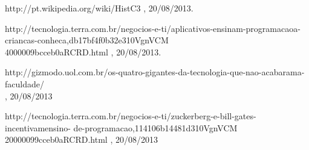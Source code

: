 \documentclass{sciposter}
\begin{document}
\begin{multicols}{3}


\begin{thebibliography}{1}

\newblock http://pt.wikipedia.org/wiki/HistC3%
, 20/08/2013.

\newblock http://tecnologia.terra.com.br/negocios-e-ti/aplicativos-ensinam-programacaoa-
criancas-conheca,db17bf4f0b32e310VgnVCM\\
4000009bcceb0aRCRD.html
, 20/08/2013.

\newblock http://gizmodo.uol.com.br/os-quatro-gigantes-da-tecnologia-que-nao-acabarama-
faculdade/\\
, 20/08/2013

\newblock http://tecnologia.terra.com.br/negocios-e-ti/zuckerberg-e-bill-gates-incentivamensino-
de-programacao,114106b14481d310VgnVCM\\
20000099cceb0aRCRD.html
, 20/08/2013

\end{thebibliography}

\end{multicols}
\end{document}
